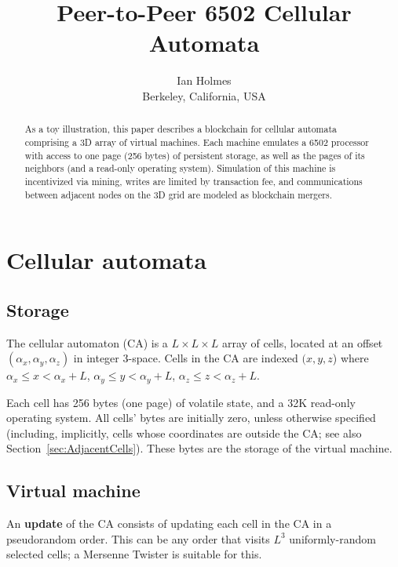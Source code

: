 \documentclass{article}
\begin{document}
\title{Peer-to-Peer 6502 Cellular Automata}
\author{Ian Holmes \\ Berkeley, California, USA}

\maketitle


\begin{abstract}
  As a toy illustration,
  this paper describes a blockchain for cellular automata
  comprising a 3D array of virtual machines.
  Each machine emulates a 6502 processor with access to one page (256 bytes) of persistent storage,
  as well as the pages of its neighbors (and a read-only operating system).
  Simulation of this machine is incentivized via mining,
  writes are limited by transaction fee,
  and communications between adjacent nodes on the 3D grid are modeled as blockchain mergers.
\end{abstract}

\section{Cellular automata}

\subsection{Storage}
\label{sec:Storage}

The cellular automaton (CA) is a $L \times L \times L$ array of cells,
located at an offset $(\alpha_x,\alpha_y,\alpha_z)$ in integer 3-space.
Cells in the CA are indexed $(x,y,z$) where
$\alpha_x \leq x < \alpha_x+L$,
$\alpha_y \leq y < \alpha_y+L$,
$\alpha_z \leq z < \alpha_z+L$.

Each cell has 256 bytes (one page) of volatile state, and a 32K read-only operating system.
All cells' bytes are initially zero, unless otherwise specified
(including, implicitly, cells whose coordinates are outside the CA; see also Section~\ref{sec:AdjacentCells}).
These bytes are the storage of the virtual machine.

\subsection{Virtual machine}

An {\bf update} of the CA consists of updating each cell in the CA in a pseudorandom order.
This can be any order that visits $L^3$ uniformly-random selected cells;
a Mersenne Twister is suitable for this.
\end{document}

